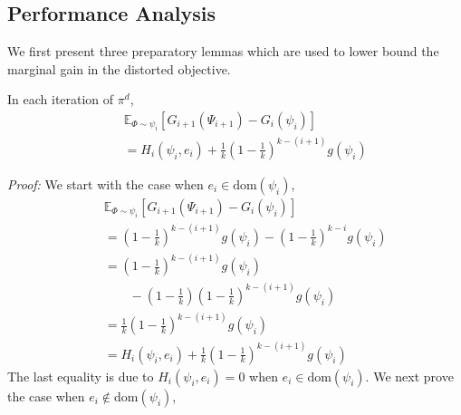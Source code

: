 \documentclass[twoside,leqno,twocolumn]{article}
\begin{document}
\subsection{Performance Analysis}
We first present three preparatory lemmas which are used to lower bound the marginal gain in the distorted objective. 
\begin{lemma}
\label{lem:a1}
In each iteration of $\pi^d$,
\begin{eqnarray*}
&&\mathbb{E}_{\Phi\sim \psi_i}[G_{i+1}(\Psi_{i+1})- G_{i}(\psi_i)] \\
&&= H_i(\psi_i, e_i)+\frac{1}{k}(1-\frac{1}{k})^{k-(i+1)} g(\psi_i)
\end{eqnarray*}
\end{lemma}
\emph{Proof:} We start with the case when $e_i\in \textrm{dom}(\psi_i)$,
\begin{eqnarray*}
&& \mathbb{E}_{\Phi\sim \psi_i}[G_{i+1}(\Psi_{i+1})- G_{i}(\psi_i)] \\
&&= (1-\frac{1}{k})^{k-(i+1)} g(\psi_i)-(1-\frac{1}{k})^{k-i} g(\psi_i)\\
&& = (1-\frac{1}{k})^{k-(i+1)} g(\psi_i)\\
&&\quad\quad-(1-\frac{1}{k}) (1-\frac{1}{k})^{k-(i+1)} g(\psi_i)\\
&& = \frac{1}{k}(1-\frac{1}{k})^{k-(i+1)} g(\psi_i) \\
&&= H_i(\psi_i, e_i)+\frac{1}{k}(1-\frac{1}{k})^{k-(i+1)} g(\psi_i)
\end{eqnarray*}
The last equality is due to $ H_i(\psi_i, e_i) = 0$ when $e_i\in \textrm{dom}(\psi_i)$. We next prove the case  when $e_i\notin \textrm{dom}(\psi_i)$,
\end{document}

